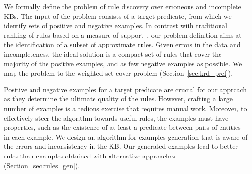 \vspace{0.5ex}
We formally define the problem of rule discovery over erroneous and incomplete KBs. The input of the problem consists of a target predicate, from which we identify sets of positive and negative examples.  In contrast with traditional ranking of rules based on a measure of support~\cite{dehaspe1999discovery,galarraga2015fast,schoenmackers2010learning}, our  problem definition aims at the identification of a subset of approximate rules. %
Given errors in the data and incompleteness, the ideal solution is a compact set of rules that cover the majority of the positive examples, and as few negative examples as possible. We map the problem to the %
weighted set cover problem (Section~\ref{sec:krd_prel}).




\vspace{0.5ex}
Positive and negative examples for a target predicate are crucial for our approach as they determine the ultimate quality of the rules. However, crafting a large number of examples is a tedious exercise that requires manual work. Moreover, to effectively steer the algorithm towards useful rules, the examples must have properties, such as the existence of at least a predicate between pairs of entities in each example. We design an algorithm for examples generation that is aware of the errors and inconsistency in the KB. Our generated examples lead to better rules than examples obtained with alternative approaches (Section~\ref{sec:rules_gen}). %



